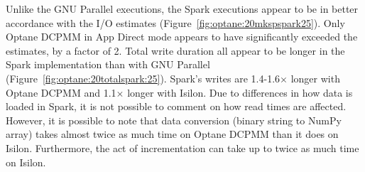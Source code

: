 Unlike the GNU Parallel executions, the Spark executions appear to be in better
accordance with the I/O estimates (Figure~\ref{fig:optane:20mkspspark25}). Only Optane
DCPMM in App Direct mode appears to have significantly exceeded the estimates,
by a factor of 2. Total write duration all appear to be longer in the Spark
implementation than with GNU Parallel (Figure~\ref{fig:optane:20totalspark:25}).
Spark's writes are 1.4-1.6$\times$ longer with Optane DCPMM and 1.1$\times$ longer with
Isilon. Due to differences in how data is loaded in Spark, it is not possible to
comment on how read times are affected. However, it is possible to note that
data conversion (binary string to NumPy array) takes almost twice as much time
on Optane DCPMM than it does on Isilon. Furthermore, the act of incrementation
can take up to twice as much time on Isilon.

